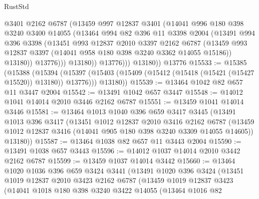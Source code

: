 \begin{lexlean}{RustStd}
\begin{coremodule}
                  @3401
                  @2162
                  @6787
                  (@13459
                    @997
                    @12837
                    @3401
                    (@14041
                      @996
                      @180
                      @398
                      @3240
                      @3400
                      @14055
                      (@13464
                        @994
                        @82
                        @396
                        @11
                        @3398
                        @2004
                        (@13491
                          @994
                          @396
                          @3398
                          (@13451
                            @993
                            @12837
                            @2010
                            @3397
                            @2162
                            @6787
                            (@13459
                              @993
                              @12837
                              @3397
                              (@14041 @958 @180 @398 @3240 @3362 @14055 @15186))
                            @13180))
                        @13776)))
                  @13180))
              @13776)))
        @13180))
    @13776
@15533 := @15385
    (@15388
      (@15394
        (@15397 (@15403 (@15409 (@15412 (@15418 (@15421 (@15427 @15520)) @13180)) @13776)))
        @13180))
@15539 := @13464 @1042 @82 @657 @11 @3447 @2004
@15542 := @13491 @1042 @657 @3447
@15548 := @14012 @1041 @14014 @2010 @3446 @2162 @6787
@15551 := @13459 @1041 @14014 @3446
@15581 := @13464
    @1013
    @1040
    @396
    @659
    @3417
    @3445
    (@13491
      @1013
      @396
      @3417
      (@13451
        @1012
        @12837
        @2010
        @3416
        @2162
        @6787
        (@13459 @1012 @12837 @3416 (@14041 @905 @180 @398 @3240 @3309 @14055 @14605))
        @13180))
@15587 := @13464 @1038 @82 @657 @11 @3443 @2004
@15590 := @13491 @1038 @657 @3443
@15596 := @14012 @1037 @14014 @2010 @3442 @2162 @6787
@15599 := @13459 @1037 @14014 @3442
@15660 := @13464
    @1020
    @1036
    @396
    @659
    @3424
    @3441
    (@13491
      @1020
      @396
      @3424
      (@13451
        @1019
        @12837
        @2010
        @3423
        @2162
        @6787
        (@13459
          @1019
          @12837
          @3423
          (@14041
            @1018
            @180
            @398
            @3240
            @3422
            @14055
            (@13464
              @1016
              @82

\end{coremodule}
\end{lexlean}

